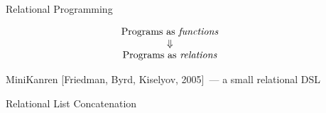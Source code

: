 \documentclass[final,20pt]{beamer}
\begin{document}
\setlength{\belowcaptionskip}{2ex} %
\setlength\belowdisplayshortskip{2ex} %

\begin{frame}[t] %

\begin{columns}[t]
  \begin{column}{\sepwid}\end{column} %

  \begin{column}{\onecolwid} %
  
    \begin{block}{Relational Programming}
      \vskip7mm
      
      
      {\Large
      $$
         \begin{array}{c}
         \mbox{Programs as \emph{functions}}\\
         \Downarrow\\
         \mbox{Programs as \emph{relations}}
         \end{array}
      $$}
      \vskip8mm
      
      
      MiniKanren [Friedman, Byrd, Kiselyov, 2005]~--- a small relational DSL
      
      \vskip8mm
      \begin{exampleblock}{Relational List Concatenation}
        
        
      \end{exampleblock}
      

\end{block}
\end{column}
\end{columns}
\end{frame}
\end{document}
